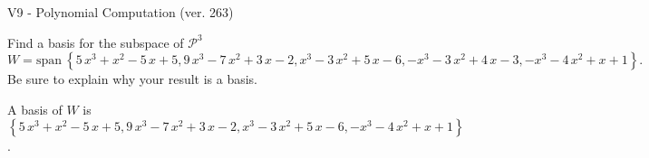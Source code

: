 \begin{exercise}
  \begin{exerciseTitle}V9 - Polynomial Computation (ver. 263)\end{exerciseTitle}
  \begin{exerciseStatement}
    Find a basis for the subspace of \(\mathcal{P}^3\) 
\[W=\mathrm{span}\ \left\{5 \, x^{3} + x^{2} - 5 \, x + 5 , 9 \, x^{3} - 7 \, x^{2} + 3 \, x - 2 , x^{3} - 3 \, x^{2} + 5 \, x - 6 , -x^{3} - 3 \, x^{2} + 4 \, x - 3 , -x^{3} - 4 \, x^{2} + x + 1\right\}.\]
 Be sure to explain why your result is a basis.


  \end{exerciseStatement}
  \begin{exerciseAnswer}
   A basis of \(W\) is  \(\left\{5 \, x^{3} + x^{2} - 5 \, x + 5 , 9 \, x^{3} - 7 \, x^{2} + 3 \, x - 2 , x^{3} - 3 \, x^{2} + 5 \, x - 6 , -x^{3} - 4 \, x^{2} + x + 1\right\}\).
  


  \end{exerciseAnswer}
\end{exercise}